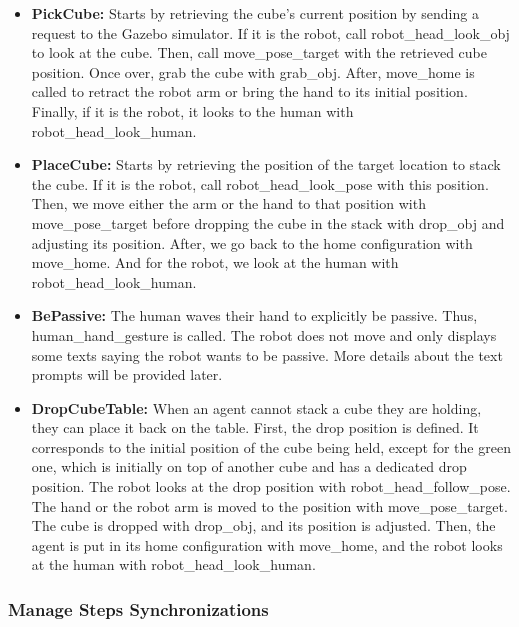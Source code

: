 \begin{itemize}
    \item \textbf{PickCube:}            Starts by retrieving the cube's current position by sending a request to the Gazebo simulator. If it is the robot, call robot\_head\_look\_obj to look at the cube. Then, call move\_pose\_target with the retrieved cube position. Once over, grab the cube with grab\_obj. After, move\_home is called to retract the robot arm or bring the hand to its initial position. Finally, if it is the robot, it looks to the human with robot\_head\_look\_human.
    
    \item \textbf{PlaceCube:}           Starts by retrieving the position of the target location to stack the cube. If it is the robot, call robot\_head\_look\_pose with this position. Then, we move either the arm or the hand to that position with move\_pose\_target before dropping the cube in the stack with drop\_obj and adjusting its position. After, we go back to the home configuration with move\_home. And for the robot, we look at the human with robot\_head\_look\_human. 
    
    \item \textbf{BePassive:}           The human waves their hand to explicitly be passive. Thus, human\_hand\_gesture is called. The robot does not move and only displays some texts saying the robot wants to be passive. More details about the text prompts will be provided later.
    
    \item \textbf{DropCubeTable:}       When an agent cannot stack a cube they are holding, they can place it back on the table. First, the drop position is defined. It corresponds to the initial position of the cube being held, except for the green one, which is initially on top of another cube and has a dedicated drop position. The robot looks at the drop position with robot\_head\_follow\_pose. The hand or the robot arm is moved to the position with move\_pose\_target. The cube is dropped with drop\_obj, and its position is adjusted. Then, the agent is put in its home configuration with move\_home, and the robot looks at the human with robot\_head\_look\_human.  
\end{itemize}

\subsubsection{Manage Steps Synchronizations}

